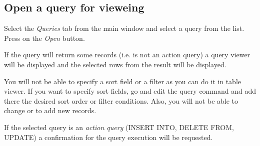 \subsection{Open a query for vieweing}
Select the \emph{Queries} tab from the main window and select a query from the list. Press on the \emph{Open} button.

If the query will return some records (i.e. is not an action query) a query viewer will be displayed and the selected rows from the result will be displayed.

You will not be able to specify a sort field or a filter as you can do it in table viewer. If you want to specify sort fields, go and edit the query command and add there the desired sort order or filter conditions.
Also, you will not be able to change or to add new records.

If the selected query is an \emph{action query} (INSERT INTO, DELETE FROM, UPDATE) a confirmation for the query execution will be requested.
